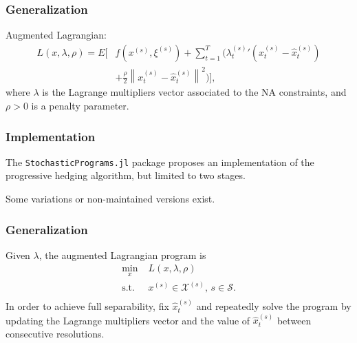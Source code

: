 \documentclass[french]{beamer}
\begin{document}
\begin{frame}
\frametitle{Generalization}

Augmented Lagrangian:
\begin{align*}
L(x,\lambda,\rho) =  E \Biggl[ & f\left( x^{(s)}, \xi^{(s)} \right) + \sum_{t = 1}^T \biggl( {\lambda_t^{(s)}}' \left(x_t^{(s)} - \hat{x}_t^{(s)}\right) \\
& + \frac{\rho}{2} \left\| x_t^{(s)} - \hat{x}_t^{(s)} \right\|^2 \biggr) \Biggr],
\end{align*}
where $\lambda$ is the Lagrange multipliers vector associated to the NA constraints, and $\rho > 0$ is a penalty parameter.

\end{frame}

\begin{frame}[fragile]
\frametitle{Implementation}

The \verb|StochasticPrograms.jl| package proposes an implementation of the progressive hedging algorithm, but limited to two stages.

\mbox{}

Some variations or non-maintained versions exist.

\end{frame}

\begin{frame}
\frametitle{Generalization}

Given $\lambda$, the augmented Lagrangian program is
\begin{equation}
\begin{aligned}
\min_{x} & \; L(x,\lambda,\rho)\\
\text{s.t.} & \; x^{(s)} \in \mathcal{X}^{(s)}, \, s \in \mathcal{S}.\\
\end{aligned}
\label{Gen-PHA-Form}
\end{equation}
In order to achieve full separability, fix $\hat{x}_t^{(s)}$ and repeatedly solve the program by updating the Lagrange multipliers vector and the value of $\hat{x}_t^{(s)}$ between consecutive resolutions.

\end{frame}
\end{document}
